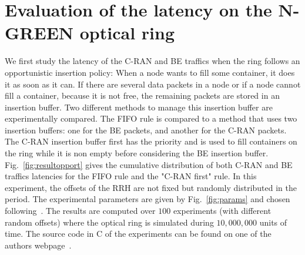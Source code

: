 \documentclass[10pt, conference, letterpaper]{IEEEtran}
\begin{document}
   \section{Evaluation of the latency on the N-GREEN optical ring}
   \label{sec:oportmethods}
   
   
  We first study the latency of the C-RAN and BE traffics when the ring follows an opportunistic insertion policy: When a node wants to fill some container, it does it as soon as it can. 
  If there are several data packets in a node or if a node cannot fill a container, because it is not free, 
  the remaining packets are stored in an insertion buffer. Two different methods to manage this insertion buffer are experimentally compared. The FIFO rule is compared to a method that uses two insertion buffers: one for the BE packets, and another for the C-RAN packets. The C-RAN insertion buffer first has the priority and is used to fill containers on the ring while it is non empty before considering the BE insertion buffer.  Fig.~\ref{fig:resultopport} gives the cumulative distribution of both C-RAN and BE traffics latencies for the FIFO rule and the "C-RAN first" rule. In this experiment, the offsets of the RRH are not fixed but randomly distributed in the period. The experimental parameters are given by Fig.~\ref{fig:params} and chosen following~\cite{ngreenarchitecture}. The results are computed over $100$ experiments (with different random offsets) where the optical ring is simulated during $10,000,000$ units of time. The source code in C of the experiments can be found on one of the authors webpage~\cite{webpage}.
  
   \vspace{0.5cm}
  \hspace{-0.75cm}
\end{document}
